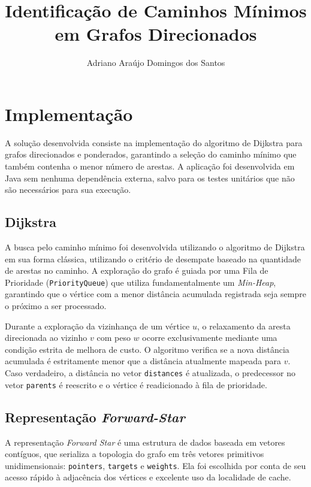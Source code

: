 \documentclass[12pt]{article}
\title{Identificação de Caminhos Mínimos em Grafos Direcionados}
\author{Adriano Araújo Domingos dos Santos\inst{1}}
\begin{document}
 

\maketitle

\section{Implementação}

A solução desenvolvida consiste na implementação do algoritmo de Dijkstra para grafos direcionados e ponderados, garantindo a seleção do caminho mínimo que também contenha o menor número de arestas. A aplicação foi desenvolvida em Java sem nenhuma dependência externa, salvo para os testes unitários que não são necessários para sua execução.

\subsection{Dijkstra} \label{dijkstra}

A busca pelo caminho mínimo foi desenvolvida utilizando o algoritmo de Dijkstra em sua forma clássica, utilizando o critério de desempate baseado na quantidade de arestas no caminho. A exploração do grafo é guiada por uma Fila de Prioridade (\texttt{PriorityQueue}) que utiliza fundamentalmente um \textit{Min-Heap}, garantindo que o vértice com a menor distância acumulada registrada seja sempre o próximo a ser processado.

Durante a exploração da vizinhança de um vértice $u$, o relaxamento da aresta direcionada ao vizinho $v$ com peso $w$ ocorre exclusivamente mediante uma condição estrita de melhora de custo. O algoritmo verifica se a nova distância acumulada é estritamente menor que a distância atualmente mapeada para $v$. Caso verdadeiro, a distância no vetor \texttt{distances} é atualizada, o predecessor no vetor \texttt{parents} é reescrito e o vértice é readicionado à fila de prioridade.

\subsection{Representação \textit{Forward-Star}} \label{forwardstar}

A representação \textit{Forward Star} é uma estrutura de dados baseada em vetores contíguos, que serializa a topologia do grafo em três vetores primitivos unidimensionais: \texttt{pointers}, \texttt{targets} e \texttt{weights}. Ela foi escolhida por conta de seu acesso rápido à adjacência dos vértices e excelente uso da localidade de cache.
\end{document}
